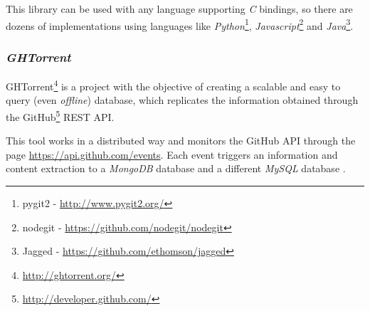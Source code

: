 This library can be used with any language supporting \emph{C} bindings, so there are dozens of implementations using languages like \emph{Python}\footnote{pygit2 - \url{http://www.pygit2.org/}}, \emph{Javascript}\footnote{nodegit - \url{https://github.com/nodegit/nodegit}} and \emph{Java}\footnote{Jagged - \url{https://github.com/ethomson/jagged}}.

\subsubsection{\emph{GHTorrent}}

GHTorrent\footnote{\url{http://ghtorrent.org/}} is a project with the objective of creating a scalable and easy to query (even \emph{offline}) database, which replicates the information obtained through the GitHub\footnote{\url{http://developer.github.com/}} REST API.

This tool works in a distributed way and monitors the GitHub API through the page \url{https://api.github.com/events}. Each event triggers an information and content extraction to a \emph{MongoDB} database and a different \emph{MySQL} database \cite{Gousios2012}.